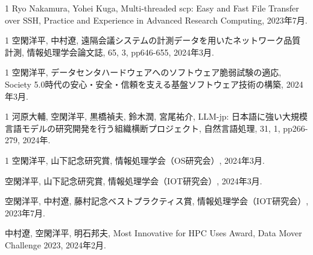 \begin{査読付}{1}
Ryo Nakamura, Yohei Kuga, Multi-threaded scp: Easy and Fast File Transfer over SSH, Practice and Experience in Advanced Research Computing, 2023年7月.

\end{査読付}

\begin{雑誌論文}{1}
空閑洋平, 中村遼, 遠隔会議システムの計測データを用いたネットワーク品質計測, 情報処理学会論文誌, 65, 3, pp646-655, 2024年3月.

\end{雑誌論文}

\begin{招待講演}{1}
空閑洋平, データセンタハードウェアへのソフトウェア脆弱試験の適応, Society 5.0時代の安心・安全・信頼を支える基盤ソフトウェア技術の構築, 2024年3月.

\end{招待講演}

\begin{招待論文}{1}
河原大輔, 空閑洋平, 黒橋禎夫, 鈴木潤, 宮尾祐介, LLM-jp: 日本語に強い大規模言語モデルの研究開発を行う組織横断プロジェクト, 自然言語処理, 31, 1, pp266-279, 2024年.

\end{招待論文}

\begin{受賞}{1}
空閑洋平, 山下記念研究賞, 情報処理学会（OS研究会）, 2024年3月.

空閑洋平, 山下記念研究賞, 情報処理学会（IOT研究会）, 2024年3月.

空閑洋平, 中村遼, 藤村記念ベストプラクティス賞, 情報処理学会（IOT研究会）, 2023年7月.

中村遼, 空閑洋平, 明石邦夫, Most Innovative for HPC Uses Award, Data Mover Challenge 2023, 2024年2月.

\end{受賞}
